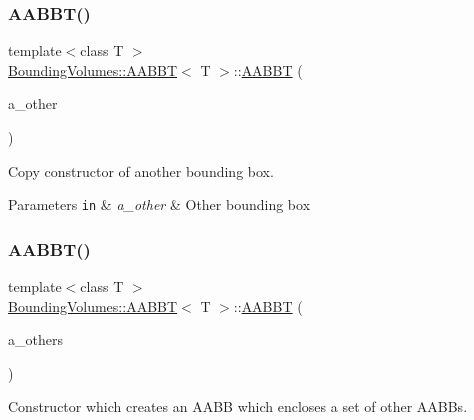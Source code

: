 \subsubsection{\texorpdfstring{A\+A\+B\+B\+T()}{AABBT()}\hspace{0.1cm}{\footnotesize\ttfamily [2/4]}}
{\footnotesize\ttfamily template$<$class T $>$ \\
\hyperlink{classBoundingVolumes_1_1AABBT}{Bounding\+Volumes\+::\+A\+A\+B\+BT}$<$ T $>$\+::\hyperlink{classBoundingVolumes_1_1AABBT}{A\+A\+B\+BT} (\begin{DoxyParamCaption}\item[{const \hyperlink{classBoundingVolumes_1_1AABBT}{A\+A\+B\+BT}$<$ T $>$ \&}]{a\+\_\+other }\end{DoxyParamCaption})}



Copy constructor of another bounding box. 


\begin{DoxyParams}[1]{Parameters}
\mbox{\tt in}  & {\em a\+\_\+other} & Other bounding box \\
\hline
\end{DoxyParams}
\mbox{\label{classBoundingVolumes_1_1AABBT_a08ddef449ffd740163b584c8ccd6f395}} 
\subsubsection{\texorpdfstring{A\+A\+B\+B\+T()}{AABBT()}\hspace{0.1cm}{\footnotesize\ttfamily [3/4]}}
{\footnotesize\ttfamily template$<$class T $>$ \\
\hyperlink{classBoundingVolumes_1_1AABBT}{Bounding\+Volumes\+::\+A\+A\+B\+BT}$<$ T $>$\+::\hyperlink{classBoundingVolumes_1_1AABBT}{A\+A\+B\+BT} (\begin{DoxyParamCaption}\item[{const std\+::vector$<$ \hyperlink{classBoundingVolumes_1_1AABBT}{A\+A\+B\+BT}$<$ T $>$ $>$ \&}]{a\+\_\+others }\end{DoxyParamCaption})}



Constructor which creates an A\+A\+BB which encloses a set of other A\+A\+B\+Bs. 


